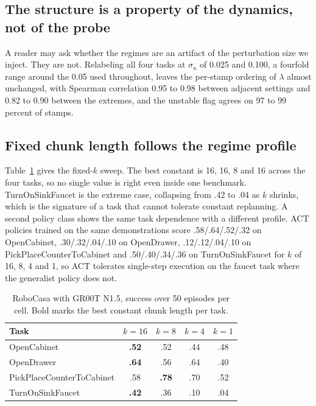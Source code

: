 \subsection{The structure is a property of the dynamics, not of the probe}

A reader may ask whether the regimes are an artifact of the perturbation size
we inject. They are not. Relabeling all four tasks at $\sigma_u$ of 0.025 and
0.100, a fourfold range around the 0.05 used throughout, leaves the per-stamp
ordering of $\lambda$ almost unchanged, with Spearman correlation 0.95 to 0.98
between adjacent settings and 0.82 to 0.90 between the extremes, and the
unstable flag agrees on 97 to 99 percent of stamps.

\subsection{Fixed chunk length follows the regime profile}

Table~\ref{tab:fixed} gives the fixed-$k$ sweep. The best constant is 16, 16, 8
and 16 across the four tasks, so no single value is right even inside one
benchmark. TurnOnSinkFaucet is the extreme case, collapsing from .42 to .04 as
$k$ shrinks, which is the signature of a task that cannot tolerate constant
replanning. A second policy class shows the same task dependence with a
different profile. ACT policies trained on the same demonstrations score
.58/.64/.52/.32 on OpenCabinet, .30/.32/.04/.10 on OpenDrawer,
.12/.12/.04/.10 on PickPlaceCounterToCabinet and .50/.40/.34/.36 on
TurnOnSinkFaucet for $k$ of 16, 8, 4 and 1, so ACT tolerates single-step
execution on the faucet task where the generalist policy does not.

\begin{table}[t]
\centering
\small
\begin{tabular}{lcccc}
\toprule
Task & $k{=}16$ & $k{=}8$ & $k{=}4$ & $k{=}1$ \\
\midrule
OpenCabinet & \textbf{.52} & .52 & .44 & .48 \\
OpenDrawer & \textbf{.64} & .56 & .64 & .40 \\
PickPlaceCounterToCabinet & .58 & \textbf{.78} & .70 & .52 \\
TurnOnSinkFaucet & \textbf{.42} & .36 & .10 & .04 \\
\bottomrule
\end{tabular}
\caption{RoboCasa with GR00T N1.5, success over 50 episodes per cell. Bold
marks the best constant chunk length per task.}
\label{tab:fixed}
\end{table}

